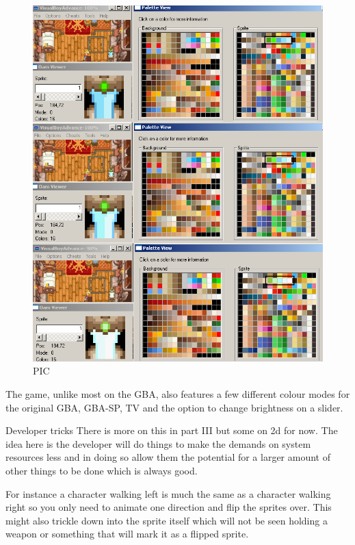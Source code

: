 \documentclass[
]{book}
\begin{document}
\begin{figure}
\centering
\includegraphics{images/53_home_fast6191_romhackingguide_unrenamed_file___rs_romhackingguidegraphicspaletteanimation1.png}
\caption{PIC}
\end{figure}

The game, unlike most on the GBA, also features a few different colour modes for the original GBA, GBA-SP, TV and the option to change brightness on a slider.

Developer tricks There is more on this in part III but some on 2d for now. The idea here is the developer will do things to make the demands on system resources less and in doing so allow them the potential for a larger amount of other things to be done which is always good.

For instance a character walking left is much the same as a character walking right so you only need to animate one direction and flip the sprites over. This might also trickle down into the sprite itself which will not be seen holding a weapon or something that will mark it as a flipped sprite.
\end{document}
